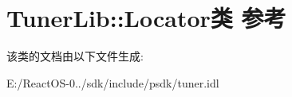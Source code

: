 \hypertarget{class_tuner_lib_1_1_locator}{}\section{Tuner\+Lib\+:\+:Locator类 参考}
\label{class_tuner_lib_1_1_locator}


该类的文档由以下文件生成\+:\begin{DoxyCompactItemize}
\item 
E\+:/\+React\+O\+S-\/0../sdk/include/psdk/tuner.\+idl\end{DoxyCompactItemize}
